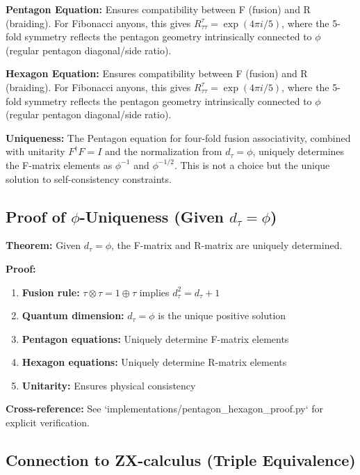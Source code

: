 \documentclass[11pt]{article}
\theoremstyle{definition}
\newcommand{\goldenratio}{\phi}
\begin{document}
\textbf{Pentagon Equation:}
Ensures compatibility between F (fusion) and R (braiding). For Fibonacci anyons, this gives $R^\tau_{\tau\tau} = \exp(4\pi i/5)$, where the 5-fold symmetry reflects the pentagon geometry intrinsically connected to $\goldenratio$ (regular pentagon diagonal/side ratio).

\textbf{Hexagon Equation:}
Ensures compatibility between F (fusion) and R (braiding). For Fibonacci anyons, this gives $R^\tau_{\tau\tau} = \exp(4\pi i/5)$, where the 5-fold symmetry reflects the pentagon geometry intrinsically connected to $\goldenratio$ (regular pentagon diagonal/side ratio).

\textbf{Uniqueness:}
The Pentagon equation for four-fold fusion associativity, combined with unitarity $F^\dagger F = I$ and the normalization from $d_\tau = \goldenratio$, uniquely determines the F-matrix elements as $\goldenratio^{-1}$ and $\goldenratio^{-1/2}$. This is not a choice but the unique solution to self-consistency constraints.

\subsection{Proof of $\goldenratio$-Uniqueness (Given $d_\tau = \goldenratio$)}

\textbf{Theorem:} Given $d_\tau = \goldenratio$, the F-matrix and R-matrix are uniquely determined.

\textbf{Proof:}
\begin{enumerate}
\item \textbf{Fusion rule:} $\tau \otimes \tau = 1 \oplus \tau$ implies $d_\tau^2 = d_\tau + 1$
\item \textbf{Quantum dimension:} $d_\tau = \goldenratio$ is the unique positive solution
\item \textbf{Pentagon equations:} Uniquely determine F-matrix elements
\item \textbf{Hexagon equations:} Uniquely determine R-matrix elements
\item \textbf{Unitarity:} Ensures physical consistency
\end{enumerate}

\textbf{Cross-reference:} See `implementations/pentagon_hexagon_proof.py` for explicit verification.

\subsection{Connection to ZX-calculus (Triple Equivalence)}
\end{document}
